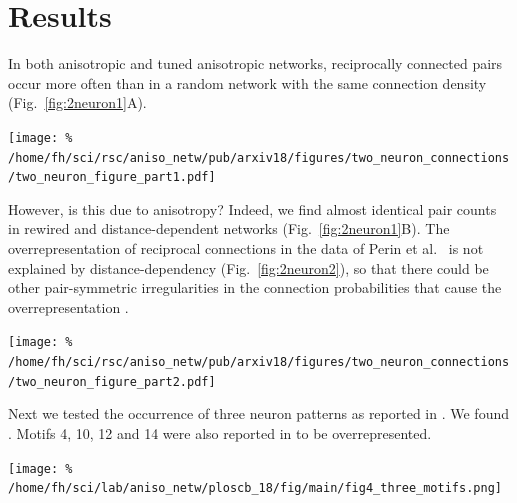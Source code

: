 
\vspace{-0.5cm}
\section*{Results}
\vspace{-0.5cm}

In both anisotropic and tuned anisotropic networks, reciprocally connected pairs occur more often than in a random network with the same connection density (Fig.~\ref{fig:2neuron1}A).

\begin{center}\vspace{0.01cm}
  \texttt{[image: \%
    /home/fh/sci/rsc/aniso\_netw/pub/arxiv18/figures/two\_neuron\_connections/two\_neuron\_figure\_part1.pdf]}
  \label{fig:2neuron1}
\end{center}\vspace{2cm}

However, is this due to anisotropy? Indeed, we find almost identical pair counts in rewired and distance-dependent networks (Fig.~\ref{fig:2neuron1}B). The overrepresentation of reciprocal connections in the data of Perin et al.~\cite{Perin2011} is not explained by distance-dependency (Fig.~\ref{fig:2neuron2}), so that there could be other pair-symmetric irregularities in the connection probabilities that cause the overrepresentation \cite{Hoffmann2017}.

\begin{center}\vspace{0.01cm}
  \texttt{[image: \%
    /home/fh/sci/rsc/aniso\_netw/pub/arxiv18/figures/two\_neuron\_connections/two\_neuron\_figure\_part2.pdf]}
  \label{fig:2neuron2}
\end{center}\vspace{2cm}

Next we tested the occurrence of three neuron patterns as reported in \cite{Song2005}. We found . Motifs 4, 10, 12 and 14 were also reported in \cite{Perin2011} to be overrepresented.



\begin{center}\vspace{0.01cm}
  \texttt{[image: \%
    /home/fh/sci/lab/aniso\_netw/ploscb\_18/fig/main/fig4\_three\_motifs.png]}
  \label{fig:spines}
\end{center}\vspace{2cm}





